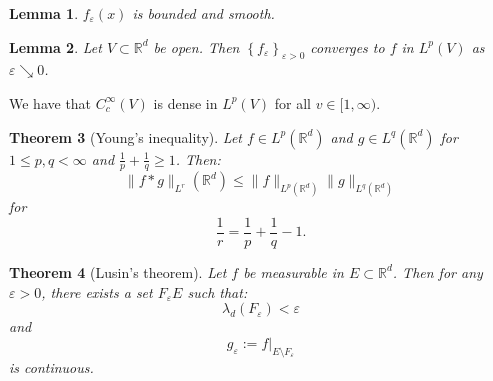 \documentclass{article}
\newtheorem{theorem}{Theorem}
\newtheorem{lemma}[theorem]{Lemma}
\theoremstyle{definition}
\numberwithin{theorem}{section}
\numberwithin{equation}{section}
\begin{document}
\begin{lemma}
	$f_\varepsilon(x)$ is bounded and smooth. 
\end{lemma}

\begin{lemma}
	Let $V \subset \mathbb{R}^d$ be open. Then $\left\{f_\varepsilon \right\}_{\varepsilon > 0}$ converges to $f$ in $L^p(V)$ as $\varepsilon \searrow 0$. 
\end{lemma}

We have that $C^\infty_c(V)$ is dense in $L^p(V)$ for all $v \in [1, \infty)$. 

\begin{theorem}[Young's inequality]
	Let $ f \in L^p(\mathbb{R}^d)$ and $g \in L^q(\mathbb{R}^d)$ for $1 \leq p , q < \infty$ and $\frac{1}{p} + \frac{1}{q} \geq 1$. Then:
	\begin{equation}
		\| f \ast g \|_{L^r}(\mathbb{R}^d) \leq \| f \|_{L^p(\mathbb{R}^d)}\| g \|_{L^q(\mathbb{R}^d)}
	\end{equation}
	for 
	\begin{equation}
		\frac{1}{r} = \frac{1}{p} + \frac{1}{q} - 1.
	\end{equation}
	
\end{theorem}

\begin{theorem}[Lusin's theorem]
	Let $f$ be measurable in $E \subset \mathbb{R}^d$. Then for any $\varepsilon > 0$, there exists a set $F_\varepsilon E$ such that:
	\begin{equation}
		\lambda_d(F_\varepsilon) < \varepsilon
	\end{equation}
	and
	\begin{equation}
		g_\varepsilon := f|_{E\setminus F_\varepsilon}
	\end{equation}
	is continuous. 
\end{theorem}
\end{document}
